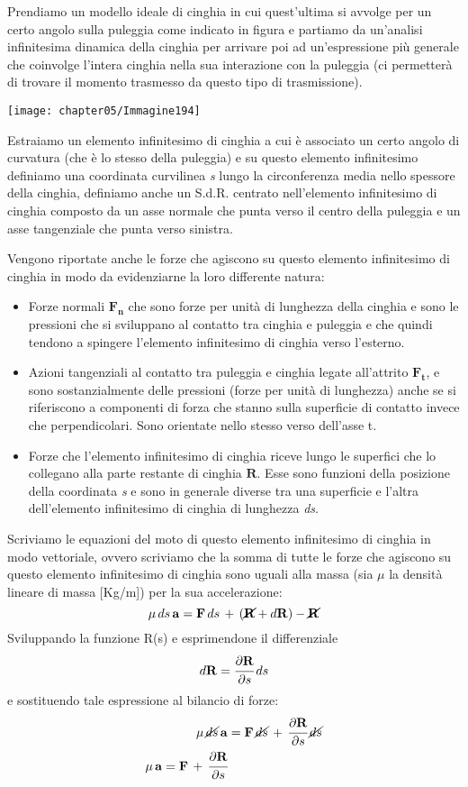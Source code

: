 Prendiamo un modello ideale di cinghia in cui quest'ultima si avvolge per un certo angolo sulla puleggia come indicato in figura e partiamo da un'analisi infinitesima dinamica della cinghia per arrivare poi ad un'espressione più generale che coinvolge l'intera cinghia nella sua interazione con la puleggia (ci permetterà di trovare il momento trasmesso da questo tipo di trasmissione).

\begin{center}
\texttt{[image: chapter05/Immagine194]}
\end{center}

Estraiamo un elemento infinitesimo di cinghia a cui è associato un certo angolo di curvatura (che è lo stesso della puleggia) e su questo elemento infinitesimo definiamo una coordinata curvilinea \emph{s} lungo la circonferenza media nello spessore della cinghia, definiamo anche un S.d.R. centrato nell'elemento infinitesimo di cinghia composto da un asse normale che punta verso il centro della puleggia e un asse tangenziale che punta verso sinistra.

Vengono riportate anche le forze che agiscono su questo elemento infinitesimo di cinghia in modo da evidenziarne la loro differente natura:
\begin{itemize}
\item Forze normali $\mathbf{F_n}$ che sono forze per unità di lunghezza della cinghia e sono le pressioni che si sviluppano al contatto tra cinghia e puleggia e che quindi tendono a spingere l'elemento infinitesimo di cinghia verso l'esterno.
\item Azioni tangenziali al contatto tra puleggia e cinghia legate all'attrito $\mathbf{F_t}$, e sono sostanzialmente delle pressioni (forze per unità di lunghezza) anche se si riferiscono a componenti di forza che stanno sulla superficie di contatto invece che perpendicolari. Sono orientate nello stesso verso dell'asse t.
\item Forze che l'elemento infinitesimo di cinghia riceve lungo le superfici che lo collegano alla parte restante di cinghia $\mathbf{R}$. Esse sono funzioni della posizione della coordinata \emph{s} e sono in generale diverse tra una superficie e l'altra dell'elemento infinitesimo di cinghia di lunghezza \emph{ds}.
\end{itemize}

Scriviamo le equazioni del moto di questo elemento infinitesimo di cinghia in modo vettoriale, ovvero scriviamo che la somma di tutte le forze che agiscono su questo elemento infinitesimo di cinghia sono uguali alla massa (sia $\mu$ la densità lineare di massa [Kg/m]) per la sua accelerazione:
\[
\mu\,ds\,\mathbf{a} = \mathbf{F}\,ds\,+\,(\cancel{\mathbf{R}} + d\mathbf{R}) - \cancel{\mathbf{R}}
\]
Sviluppando la funzione R(s) e esprimendone il differenziale 
\[d\mathbf{R} = \cfrac{\partial\mathbf{R}}{\partial s}\,ds\]
e sostituendo tale espressione al bilancio di forze:
\begin{align*}
\mu\,\cancel{ds}\,\mathbf{a} &= \mathbf{F}\,\cancel{ds}\,+\,\cfrac{\partial\mathbf{R}}{\partial s}\,\cancel{ds}\\
\mu\,\mathbf{a} = \mathbf{F}\,+\,\cfrac{\partial\mathbf{R}}{\partial s}
\end{align*}

